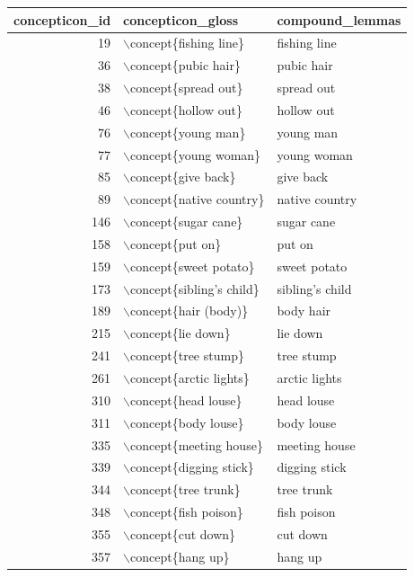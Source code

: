 \begin{table}[ht]
\centering
\begin{tabular}{rll}
  \hline
concepticon\_id & concepticon\_gloss & compound\_lemmas \\ 
  \hline
19 & $\backslash$concept\{fishing line\} & fishing line \\ 
  36 & $\backslash$concept\{pubic hair\} & pubic hair \\ 
  38 & $\backslash$concept\{spread out\} & spread out \\ 
  46 & $\backslash$concept\{hollow out\} & hollow out \\ 
  76 & $\backslash$concept\{young man\} & young man \\ 
  77 & $\backslash$concept\{young woman\} & young woman \\ 
  85 & $\backslash$concept\{give back\} & give back \\ 
  89 & $\backslash$concept\{native country\} & native country \\ 
  146 & $\backslash$concept\{sugar cane\} & sugar cane \\ 
  158 & $\backslash$concept\{put on\} & put on \\ 
  159 & $\backslash$concept\{sweet potato\} & sweet potato \\ 
  173 & $\backslash$concept\{sibling's child\} & sibling’s child \\ 
  189 & $\backslash$concept\{hair (body)\} & body hair \\ 
  215 & $\backslash$concept\{lie down\} & lie down \\ 
  241 & $\backslash$concept\{tree stump\} & tree stump \\ 
  261 & $\backslash$concept\{arctic lights\} & arctic lights \\ 
  310 & $\backslash$concept\{head louse\} & head louse \\ 
  311 & $\backslash$concept\{body louse\} & body louse \\ 
  335 & $\backslash$concept\{meeting house\} & meeting house \\ 
  339 & $\backslash$concept\{digging stick\} & digging stick \\ 
  344 & $\backslash$concept\{tree trunk\} & tree trunk \\ 
  348 & $\backslash$concept\{fish poison\} & fish poison \\ 
  355 & $\backslash$concept\{cut down\} & cut down \\ 
  357 & $\backslash$concept\{hang up\} & hang up \\ 

\end{tabular}
\end{table}
